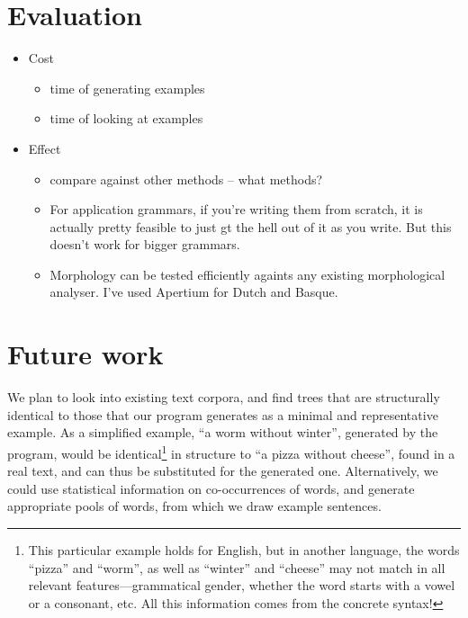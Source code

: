 \section{Evaluation}


\begin{itemize}
\item Cost
  \begin{itemize}
  \item time of generating examples
  \item time of looking at examples
  \end{itemize}

\item Effect
  \begin{itemize}
  \item compare against other methods -- what methods?
  \item For application grammars, if you're writing them from scratch, it is actually pretty feasible to just gt the hell out of it as you write. But this doesn't work for bigger grammars.
  \item Morphology can be tested efficiently againts any existing morphological analyser. I've used Apertium for Dutch and Basque.
  \end{itemize}
\end{itemize}


\section{Future work}

We plan to look into existing text corpora, and find trees that are
structurally identical  to those that our program generates as a
minimal and representative example. As a simplified example, ``a worm
without winter'', generated by the program, would be identical\footnote{This particular example holds for English, but in another language, the words ``pizza'' and ``worm'', as well as ``winter'' and ``cheese'' may not match in all relevant features---grammatical gender, whether the word starts with a vowel or a consonant, etc. All this information comes from the concrete syntax!} 
in structure to ``a pizza without cheese'', found in a real text, and
can thus be substituted for the generated one.   
Alternatively, we could use statistical information on co-occurrences
of words, and generate appropriate pools of words, from which we draw
example sentences. 
